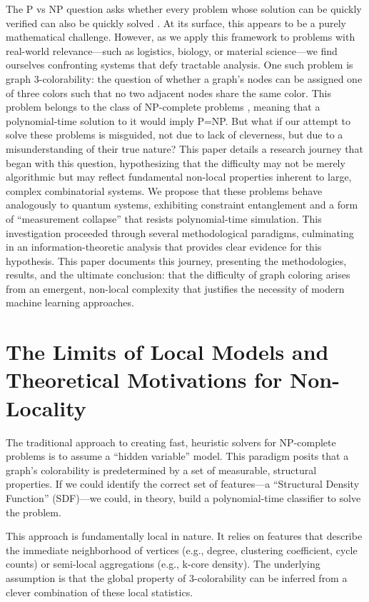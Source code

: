 \documentclass[12pt, letterpaper]{article}
\begin{document}
The P vs NP question asks whether every problem whose solution can be quickly verified can also be quickly solved \cite{cook1971complexity}. At its surface, this appears to be a purely mathematical challenge. However, as we apply this framework to problems with real-world relevance—such as logistics, biology, or material science—we find ourselves confronting systems that defy tractable analysis. One such problem is graph 3-colorability: the question of whether a graph's nodes can be assigned one of three colors such that no two adjacent nodes share the same color. This problem belongs to the class of NP-complete problems \cite{karp1972reducibility}, meaning that a polynomial-time solution to it would imply P=NP. But what if our attempt to solve these problems is misguided, not due to lack of cleverness, but due to a misunderstanding of their true nature? This paper details a research journey that began with this question, hypothesizing that the difficulty may not be merely algorithmic but may reflect fundamental non-local properties inherent to large, complex combinatorial systems. We propose that these problems behave analogously to quantum systems, exhibiting constraint entanglement and a form of ``measurement collapse'' that resists polynomial-time simulation. This investigation proceeded through several methodological paradigms, culminating in an information-theoretic analysis that provides clear evidence for this hypothesis. This paper documents this journey, presenting the methodologies, results, and the ultimate conclusion: that the difficulty of graph coloring arises from an emergent, non-local complexity that justifies the necessity of modern machine learning approaches.

\section{The Limits of Local Models and Theoretical Motivations for Non-Locality}

The traditional approach to creating fast, heuristic solvers for NP-complete problems is to assume a ``hidden variable'' model. This paradigm posits that a graph's colorability is predetermined by a set of measurable, structural properties. If we could identify the correct set of features—a ``Structural Density Function'' (SDF)—we could, in theory, build a polynomial-time classifier to solve the problem.

This approach is fundamentally local in nature. It relies on features that describe the immediate neighborhood of vertices (e.g., degree, clustering coefficient, cycle counts) or semi-local aggregations (e.g., k-core density). The underlying assumption is that the global property of 3-colorability can be inferred from a clever combination of these local statistics.
\end{document}
